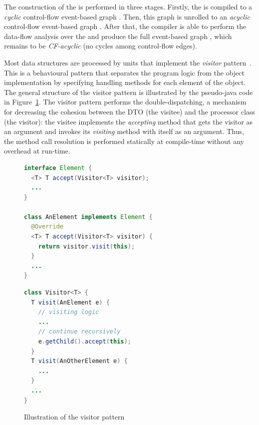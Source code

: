 The construction of the \xgraph{} is performed in three stages.
Firstly, the \ytree{} is compiled to a \textit{cyclic} control-flow event-based graph \xgraph[CF].
Then, this graph is unrolled to an \textit{acyclic} control-flow event-based graph \xgraphU[CF].
After that, the compiler is able to perform the data-flow analysis over the \xgraphU[CF] and produce the full event-based graph \xgraphU[CF+DF], which remains to be \textit{CF-acyclic} (no cycles among control-flow edges).

Most data structures are processed by units that implement the \textit{visitor} pattern~\cite{palsberg1998essence}.
This is a behavioural pattern that separates the program logic from the object implementation by specifying handling methods for each element of the object.
The general structure of the visitor pattern is illustrated by the pseudo-java code in Figure~\ref{fig:visitor}.
The visitor pattern performs the double-dispatching, a mechanism for decreasing the cohesion between the DTO (the visitee) and the processor class (the visitor): the visitee implements the \textit{accepting} method that gets the visitor as an argument and invokes its \textit{visiting} method with itself as an argument.
Thus, the method call resolution is performed statically at compile-time without any overhead at run-time.

\begin{figure}[h]
\centering
\begin{minipage}[t]{.55\textwidth}
\begin{lstlisting}[language=java]
interface Element {
  <T> T accept(Visitor<T> visitor);
  ...
}

class AnElement implements Element {
  @Override
  <T> T accept(Visitor<T> visitor) {
    return visitor.visit(this);
  }
  ...
}
\end{lstlisting}
\end{minipage}
\begin{minipage}[t]{.45\textwidth}
\begin{lstlisting}[language=java]
class Visitor<T> {
  T visit(AnElement e) {
    // visiting logic
    ...
    // continue recursively
    e.getChild().accept(this);
  }
  T visit(AnOtherElement e) {
    ...
  }
  ...
}
\end{lstlisting}
\end{minipage}
\caption{Illustration of the visitor pattern}
\label{fig:visitor}
\end{figure}


